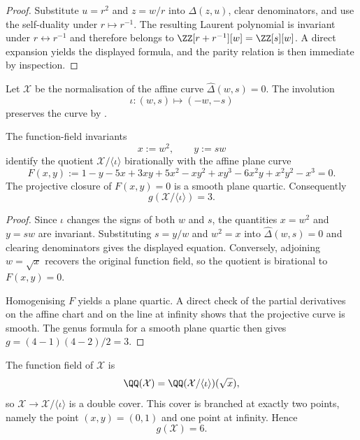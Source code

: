 \begin{proof}
  Substitute $u=r^2$ and $z=w/r$ into $\Delta(z,u)$, clear
  denominators, and use the self-duality under $r\mapsto r^{-1}$. The
  resulting Laurent polynomial is invariant under $r\leftrightarrow
  r^{-1}$ and therefore belongs to $\ZZ[r+r^{-1}][w]=\ZZ[s][w]$. A
  direct expansion yields the displayed formula, and the parity
  relation is then immediate by inspection.
\end{proof}

Let $\mathcal X$ be the normalisation of the affine curve
$\widehat\Delta(w,s)=0$. The involution
\[
  \iota:(w,s)\longmapsto(-w,-s)
\]
preserves the curve by .

\begin{proposition}
  \label{prop:sync-hatdelta-quotient}
  The function-field invariants
  \[
    x:=w^2,\qquad y:=sw
  \]
  identify the quotient $\mathcal X/\langle\iota\rangle$ birationally
  with the affine plane curve
  \[
    F(x,y):=
    1-y-5x+3xy+5x^2-xy^2+xy^3-6x^2y+x^2y^2-x^3=0.
  \]
  The projective closure of $F(x,y)=0$ is a smooth plane quartic.
  Consequently
  \[
    g(\mathcal X/\langle\iota\rangle)=3.
  \]
\end{proposition}

\begin{proof}
  Since $\iota$ changes the signs of both $w$ and $s$, the quantities
  $x=w^2$ and $y=sw$ are invariant. Substituting $s=y/w$ and
  $w^2=x$ into $\widehat\Delta(w,s)=0$ and clearing denominators gives
  the displayed equation. Conversely, adjoining $w=\sqrt{x}$ recovers
  the original function field, so the quotient is birational to
  $F(x,y)=0$.

  Homogenising $F$ yields a plane quartic. A direct check of the
  partial derivatives on the affine chart and on the line at infinity
  shows that the projective curve is smooth. The genus formula for a
  smooth plane quartic then gives $g=(4-1)(4-2)/2=3$.
\end{proof}

\begin{proposition}
  \label{prop:sync-hatdelta-double-cover}
  The function field of $\mathcal X$ is
  \[
    \QQ(\mathcal X)=\QQ(\mathcal X/\langle\iota\rangle)(\sqrt{x}),
  \]
  so $\mathcal X\to\mathcal X/\langle\iota\rangle$ is a double cover.
  This cover is branched at exactly two points, namely the point
  $(x,y)=(0,1)$ and one point at infinity. Hence
  \[
    g(\mathcal X)=6.
  \]
\end{proposition}

